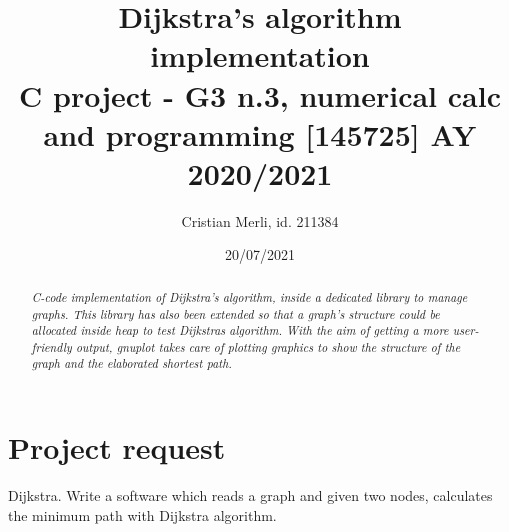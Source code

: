 \documentclass{article}                                                                                                     %
\title{Dijkstra's algorithm implementation \\                                                                               %
\large C project - G3 n.3, numerical calc and programming [145725] AY 2020/2021}                                            %
\author{Cristian Merli, id. 211384}                                                                                         %
\date{20/07/2021}                                                                                                           %
\begin{document}

\maketitle                                                                                                                  %

\vspace{1cm}                                                                                                                %
  \begin{abstract}                                                                                                          %
    \noindent \textit{C-code implementation of Dijkstra's algorithm, inside a dedicated library to manage graphs.           %
    This library has also been extended so that a graph's structure could be allocated inside heap to test
    Dijkstras algorithm. With the aim of getting a more user-friendly output, gnuplot takes care of plotting graphics
    to show the structure of the graph and the elaborated shortest path.}
  \end{abstract}                                                                                                            %
\vspace{3.5cm}                                                                                                              %

\vspace{3.5cm}                                                                                                              %
  \tableofcontents                                                                                                          %
\pagebreak                                                                                                                  %

\section{Project request}                                                                                                   %
\label{sec:project_request}                                                                                                 %
  Dijkstra. Write a software which reads a graph and given two nodes, calculates the minimum path with Dijkstra             %
  algorithm.
\end{document}
